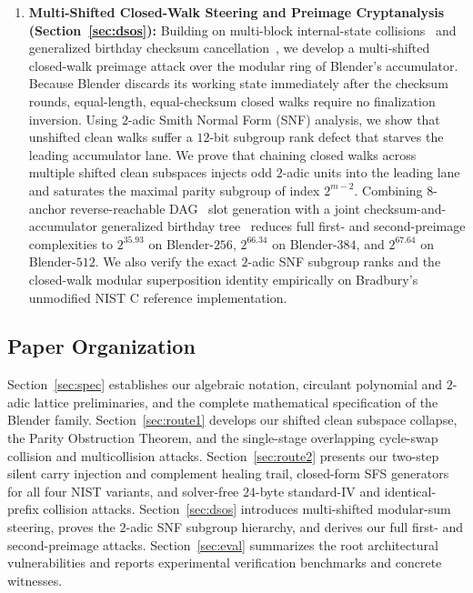 \documentclass[11pt,a4paper]{article}
\theoremstyle{definition}
\theoremstyle{remark}
\begin{document}
\begin{enumerate}[leftmargin=2em]
    \item \textbf{Multi-Shifted Closed-Walk Steering and Preimage Cryptanalysis (Section~\ref{sec:dsos}):} Building on multi-block internal-state collisions~\cite{Jou04} and generalized birthday checksum cancellation~\cite{Wag02,GK08,MPRKS08}, we develop a multi-shifted closed-walk preimage attack over the modular ring of Blender's accumulator. Because Blender discards its working state immediately after the checksum rounds, equal-length, equal-checksum closed walks require no finalization inversion. Using $2$-adic Smith Normal Form (SNF) analysis, we show that unshifted clean walks suffer a $12$-bit subgroup rank defect that starves the leading accumulator lane. We prove that chaining closed walks across multiple shifted clean subspaces injects odd $2$-adic units into the leading lane and saturates the maximal parity subgroup of index $2^{m-2}$. Combining $8$-anchor reverse-reachable DAG~\cite{KK06} slot generation with a joint checksum-and-accumulator generalized birthday tree~\cite{Wag02} reduces full first- and second-preimage complexities to $2^{35.93}$ on Blender-$256$, $2^{66.34}$ on Blender-$384$, and $2^{67.64}$ on Blender-$512$. We also verify the exact $2$-adic SNF subgroup ranks and the closed-walk modular superposition identity empirically on Bradbury's unmodified NIST C reference implementation.
\end{enumerate}

\subsection{Paper Organization}
Section~\ref{sec:spec} establishes our algebraic notation, circulant polynomial and $2$-adic lattice preliminaries, and the complete mathematical specification of the Blender family. Section~\ref{sec:route1} develops our shifted clean subspace collapse, the Parity Obstruction Theorem, and the single-stage overlapping cycle-swap collision and multicollision attacks. Section~\ref{sec:route2} presents our two-step silent carry injection and complement healing trail, closed-form SFS generators for all four NIST variants, and solver-free $24$-byte standard-IV and identical-prefix collision attacks. Section~\ref{sec:dsos} introduces multi-shifted modular-sum steering, proves the $2$-adic SNF subgroup hierarchy, and derives our full first- and second-preimage attacks. Section~\ref{sec:eval} summarizes the root architectural vulnerabilities and reports experimental verification benchmarks and concrete witnesses.
\end{document}
